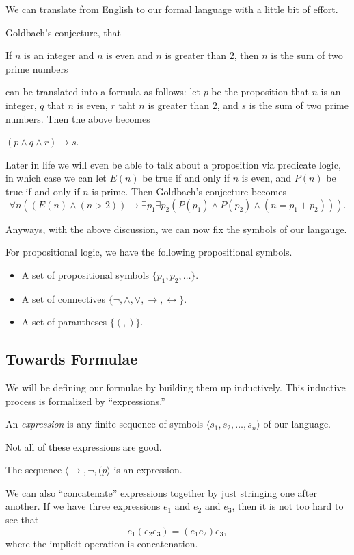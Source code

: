 We can translate from English to our formal language with a little bit of effort.
\begin{example}
	Goldbach's conjecture, that
	\begin{center}
		If $n$ is an integer and $n$ is even and $n$ is greater than $2$, then $n$ is the sum of two prime numbers
	\end{center}
	can be translated into a formula as follows: let $p$ be the proposition that $n$ is an integer, $q$ that $n$ is even, $r$ taht $n$ is greater than $2$, and $s$ is the sum of two prime numbers. Then the above becomes
	\begin{center}
		$(p\land q\land r)\to s$.
	\end{center}
\end{example}
\begin{remark}
	Later in life we will even be able to talk about a proposition via predicate logic, in which case we can let $E(n)$ be true if and only if $n$ is even, and $P(n)$ be true if and only if $n$ is prime. Then Goldbach's conjecture becomes
	\[\forall n((E(n)\land(n>2))\to\exists p_1\exists p_2(P(p_1)\land P(p_2)\land(n=p_1+p_2))).\]
\end{remark}
Anyways, with the above discussion, we can now fix the symbols of our langauge.
\begin{defi}[Symbols]
	For propositional logic, we have the following propositional symbols.
	\begin{itemize}
		\item A set of propositional symbols $\{p_1,p_2,\ldots\}$.
		\item A set of connectives $\{\lnot,\land,\lor,\to,\leftrightarrow\}$.
		\item A set of parantheses $\{(,)\}$.
	\end{itemize}
\end{defi}

\subsection{Towards Formulae}
We will be defining our formulae by building them up inductively. This inductive process is formalized by ``expressions.''
\begin{definition}[Expression]
	An \textit{expression} is any finite sequence of symbols $\langle s_1,s_2,\ldots,s_n\rangle$ of our language.
\end{definition}
Not all of these expressions are good.
\begin{example}
	The sequence $\langle\to,\lnot,(p\rangle$ is an expression.
\end{example}
We can also ``concatenate'' expressions together by just stringing one after another. If we have three expressions $e_1$ and $e_2$ and $e_3$, then it is not too hard to see that
\[e_1(e_2e_3)=(e_1e_2)e_3,\]
where the implicit operation is concatenation.

